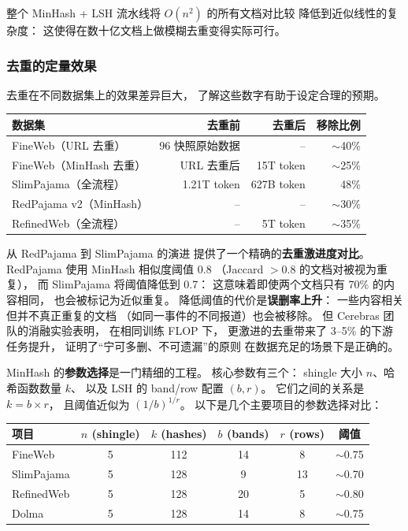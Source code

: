 整个 MinHash + LSH 流水线将 $O(n^2)$ 的所有文档对比较
降低到近似线性的复杂度：
这使得在数十亿文档上做模糊去重变得实际可行。

\subsubsection{去重的定量效果}

去重在不同数据集上的效果差异巨大，
了解这些数字有助于设定合理的预期。

\begin{center}\small
\renewcommand{\arraystretch}{1.3}
\begin{tabular}{lrrr}
\toprule
\rowcolor{figLightGray}
\textbf{数据集} & \textbf{去重前} & \textbf{去重后} & \textbf{移除比例} \\
\midrule
FineWeb（URL 去重） & 96 快照原始数据 & -- & $\sim$40\% \\
FineWeb（MinHash 去重） & URL 去重后 & 15T token & $\sim$25\% \\
SlimPajama（全流程） & 1.21T token & 627B token & 48\% \\
RedPajama v2（MinHash） & -- & -- & $\sim$30\% \\
RefinedWeb（全流程） & -- & 5T token & $\sim$35\% \\
\bottomrule
\end{tabular}
\end{center}

从 RedPajama 到 SlimPajama 的演进
提供了一个精确的\textbf{去重激进度对比}。
RedPajama 使用 MinHash 相似度阈值 0.8
（Jaccard $> 0.8$ 的文档对被视为重复），
而 SlimPajama 将阈值降低到 0.7：
这意味着即使两个文档只有 70\% 的内容相同，
也会被标记为近似重复。
降低阈值的代价是\textbf{误删率上升}：
一些内容相关但并不真正重复的文档
（如同一事件的不同报道）也会被移除。
但 Cerebras 团队的消融实验表明，
在相同训练 FLOP 下，
更激进的去重带来了 3--5\% 的下游任务提升，
证明了“宁可多删、不可遗漏”的原则
在数据充足的场景下是正确的。

MinHash 的\textbf{参数选择}是一门精细的工程。
核心参数有三个：
shingle 大小 $n$、哈希函数数量 $k$、
以及 LSH 的 band/row 配置 $(b, r)$。
它们之间的关系是 $k = b \times r$，
且阈值近似为 $(1/b)^{1/r}$。
以下是几个主要项目的参数选择对比：

\begin{center}\small
\renewcommand{\arraystretch}{1.3}
\begin{tabular}{lccccc}
\toprule
\rowcolor{figLightGray}
\textbf{项目} & $n$ (shingle) & $k$ (hashes) & $b$ (bands) & $r$ (rows) & 阈值 \\
\midrule
FineWeb & 5 & 112 & 14 & 8 & $\sim$0.75 \\
SlimPajama & 5 & 128 & 9 & 13 & $\sim$0.70 \\
RefinedWeb & 5 & 128 & 20 & 5 & $\sim$0.80 \\
Dolma & 5 & 128 & 14 & 8 & $\sim$0.75 \\
\bottomrule
\end{tabular}
\end{center}

